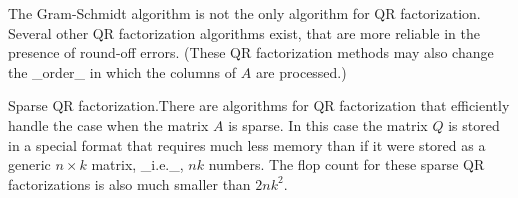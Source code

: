 The Gram-Schmidt algorithm is not the only algorithm for QR factorization. Several other QR factorization algorithms exist, that are more reliable in the presence of round-off errors. (These QR factorization methods may also change the _order_ in which the columns of \(A\) are processed.)

Sparse QR factorization.There are algorithms for QR factorization that efficiently handle the case when the matrix \(A\) is sparse. In this case the matrix \(Q\) is stored in a special format that requires much less memory than if it were stored as a generic \(n\times k\) matrix, _i.e._, \(nk\) numbers. The flop count for these sparse QR factorizations is also much smaller than \(2nk^{2}\).

 